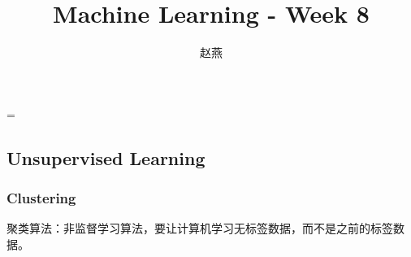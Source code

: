 \documentclass{article}
\title{Machine Learning - Week 8}
\author{赵燕}
\date{}
\begin{document}
 
\hfuzz=\maxdimen
{}
\begin{CJK}{UTF8}{gbsn} 
\maketitle
\renewcommand\contentsname{目录}
\renewcommand\figurename{图}
\tableofcontents
\newpage

\part{Unsupervised Learning}
\section{Clustering}
\subparagraph{}
聚类算法：非监督学习算法，要让计算机学习无标签数据，而不是之前的标签数据。

\end{CJK}
\end{document}

